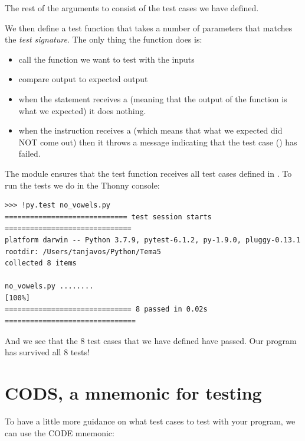 The rest of the arguments to  consist of the test cases we have defined.

We then define a test function  that takes a number of parameters that matches the \emph{test signature}. The only thing the function does is:
\begin{itemize}
    \item call the function we want to test with the inputs 
    \item compare output to expected output 
    \item when the  statement receives a  (meaning that the output of the function is what we expected) it does nothing.
    \item when the  instruction receives a  (which means that what we expected did NOT come out) then it throws a message indicating that the test case () has failed.
\end{itemize}


The  module ensures that the test function receives all test cases defined in . To run the tests we do in the Thonny console:


\begin{Verbatim}[frame=single]
>>> !py.test no_vowels.py
============================= test session starts ==============================
platform darwin -- Python 3.7.9, pytest-6.1.2, py-1.9.0, pluggy-0.13.1
rootdir: /Users/tanjavos/Python/Tema5
collected 8 items

no_vowels.py ........                                                    [100%]
============================== 8 passed in 0.02s ===============================
\end{Verbatim}
    
And we see that the 8 test cases that we have defined have passed. Our program has survived all 8 tests!


\section{CODS, a mnemonic for testing}\label{test-mnemonic}

To have a little more guidance on what test cases to test with your program, we can use the CODE mnemonic:


